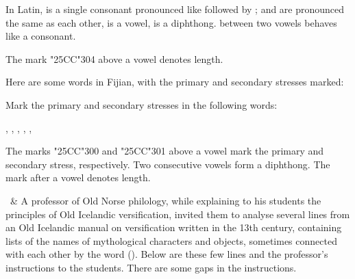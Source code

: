 \begin{refsection}
\begin{problem}{\langnameAncientGreek}{\nameDMirea}{}
\begin{tblsWarning}
In Latin,  is a single consonant pronounced like  followed by ;  and  are pronounced the same as each other,  is a vowel,  is a diphthong.  between two vowels behaves like a consonant. 

The mark {\char"25CC\char"304} above a vowel denotes length. %
\end{tblsWarning}
\end{problem}
\pagebreak

\begin{problem}{\langnameFijian}{\nameRDinca}{}
Here are some words in Fijian, with the primary and secondary stresses marked:

\begin{exe}\sloppy
{}
\end{exe}

\begin{assgts}
\item Mark the primary and secondary stresses in the following words:
\begin{center}
, , , , , 
\end{center}
\end{assgts}

\begin{tblsWarning} 
The marks {\char"25CC\char"300} and {\char"25CC\char"301} above a vowel mark the primary and secondary stress, respectively. Two consecutive vowels form a diphthong. The mark \cmubdata{:} after a vowel denotes length.
\end{tblsWarning}
\end{problem}

\begin{problem}{\langnameOldNorse}{\namePArkadiev\ \& \nameEGurevich}{}
A professor of Old Norse philology, while explaining to his students the principles of Old Icelandic versification, invited them to analyse several lines from an Old Icelandic manual on versification written in the 13th century, containing lists of the names of mythological characters and objects, sometimes connected with each other by the word  (). Below are these few lines and the professor's instructions to the students. There are some gaps in the instructions. 


\end{problem}
\end{refsection}
